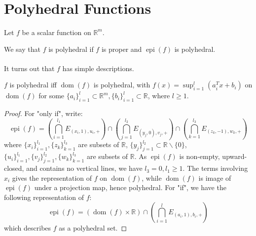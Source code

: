 \section{Polyhedral Functions}

\paragraph{}Let $f$ be a scalar function on $\mathbb{R}^m$.

\begin{defn}\label{defn:026-polyhedral-functions}
	We say that $f$ is polyhedral if $f$ is proper and $\operatorname{epi}(f)$ is polyhedral.
\end{defn}

\paragraph{}It turns out that $f$ has simple descriptions.

\begin{prop}\label{prop:026-polyhedral-function-representation}
	$f$ is polyhedral iff $\operatorname{dom}(f)$ is polyhedral, with $f(x)=\sup_{i=1}^l (a_i^Tx+b_i)$ on $\operatorname{dom}(f)$ for some $\{a_i\}_{i=1}^l\subset \mathbb{R}^m,\{b_i\}_{i=1}^l\subset \mathbb{R}$, where $l\geq 1$.
\end{prop}
\begin{proof}
	For "only if", write:
	\[
		\operatorname{epi}(f) = \left(\bigcap_{i=1}^{l_1}E_{(x_i,1),u_i,+}\right)
		\cap\left(\bigcap_{j=1}^{l_2}E_{(y_j,0),v_j,+}\right)
		\cap\left(\bigcap_{k=1}^{l_3}E_{(z_k,-1),w_k,+}\right)
	\]
	where $\{x_i\}_{i=1}^{l_1},\{z_k\}_{k=1}^{l_3}$ are subsets of $\mathbb{R}$, $\{y_j\}_{j=1}^{l_2}\subset \mathbb{R}\smallsetminus\{0\}$, $\{u_i\}_{i=1}^{l_1},\{v_j\}_{j=1}^{l_2},\{w_k\}_{k=1}^{l_3}$ are subsets of $\mathbb{R}$. As $\operatorname{epi}(f)$ is non-empty, upward-closed, and contains no vertical lines, we have $l_3=0,l_1\geq 1$. The terms involving $x_i$ gives the representation of $f$ on $\operatorname{dom}(f)$, while $\operatorname{dom}(f)$ is image of $\operatorname{epi}(f)$ under a projection map, hence polyhedral. For "if", we have the following representation of $f$:
	\[
		\operatorname{epi}(f) = \left(\operatorname{dom}(f)\times \mathbb{R}\right)\cap\left(\bigcap_{i=1}^lE_{(a_i,1),b_i,+}\right)
	\]
	which describes $f$ as a polyhedral set.
\end{proof}

